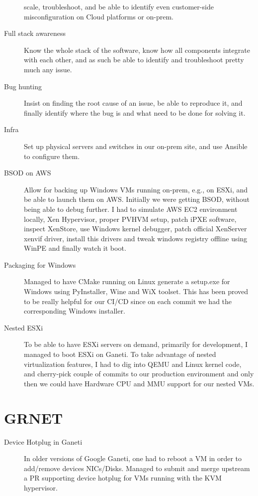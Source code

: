\documentclass[margin,centered]{res}
\begin{document}
\begin{resume}
\begin{description}
scale, troubleshoot, and be able to identify even customer-side
misconfiguration on Cloud platforms or on-prem.
\item[Full stack awareness]
Know the whole stack of the software, know how all components integrate with
each other, and as such be able to identify and troubleshoot pretty much any
issue.
\item[Bug hunting]
Insist on finding the root cause of an issue, be able to reproduce it, and
finally identify where the bug is and what need to be done for solving it.
\item[Infra]
Set up physical servers and switches in our on-prem site, and use Ansible
to configure them.
\item[BSOD on AWS]
Allow for backing up Windows VMs running on-prem, e.g., on ESXi, and be
able to launch them on AWS. Initially we were getting BSOD, without being
able to debug further. I had to simulate AWS EC2 environment
locally, Xen Hypervisor, proper PVHVM setup, patch iPXE software, inspect
XenStore, use Windows kernel debugger, patch official XenServer xenvif driver,
install this drivers and tweak windows registry offline using WinPE and
finally watch it boot.
\item[Packaging for Windows]
Managed to have CMake running on Linux generate a setup.exe for Windows using
PyInstaller, Wine and WiX toolset. This has been proved to be really helpful for
our CI/CD since on each commit we had the corresponding Windows installer.
\item[Nested ESXi]
To be able to have ESXi servers on demand, primarily for development, I managed
to boot ESXi on Ganeti. To take advantage of nested
virtualization features, I had to dig into QEMU and Linux kernel code, and
cherry-pick couple of commits to our production environment and only then we
could have Hardware CPU and MMU support for our nested VMs.
\end{description}


\section{\sc GRNET}

\begin{description}
\item[Device Hotplug in Ganeti]
In older versions of Google Ganeti, one had to reboot a VM in order to
add/remove devices NICs/Disks. Managed to submit and merge upstream a PR
supporting device hotplug for VMs running with the KVM hypervisor.


\end{description}
\end{resume}
\end{document}
